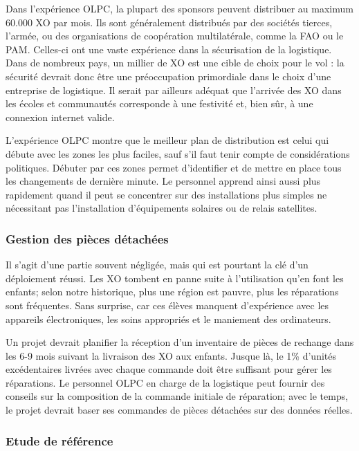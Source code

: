 \documentclass[12pt]{article}
\begin{document}

Dans l'expérience OLPC, la plupart des sponsors peuvent distribuer au
maximum 60.000 XO par mois. Ils sont généralement distribués par des
sociétés tierces, l'armée, ou des organisations de coopération
multilatérale, comme la FAO ou le PAM. Celles-ci ont une vaste expérience
dans la sécurisation de la logistique. Dans de nombreux pays, un millier de
XO est une cible de choix pour le vol : la sécurité devrait donc être une
préoccupation primordiale dans le choix d'une entreprise de logistique. Il
serait par ailleurs adéquat que l'arrivée des XO dans les écoles et
communautés corresponde à une festivité et, bien sûr, à une connexion
internet valide.

L'expérience OLPC montre que le meilleur plan de distribution est celui qui
débute avec les zones les plus faciles, sauf s'il faut tenir compte de
considérations politiques. Débuter par ces zones permet d’identifier et de
mettre en place tous les changements de dernière minute. Le personnel
apprend ainsi aussi plus rapidement quand il peut se concentrer sur des
installations plus simples ne nécessitant pas l'installation d'équipements
solaires ou de relais satellites.
\subsubsection{Gestion des pièces détachées}
\label{sec-9-1-3}



Il s'agit d'une partie souvent négligée, mais qui est pourtant la clé d'un
déploiement réussi. Les XO tombent en panne suite à l'utilisation qu'en
font les enfants; selon notre historique, plus une région est pauvre, plus
les réparations sont fréquentes. Sans surprise, car ces élèves manquent
d'expérience avec les appareils électroniques, les soins appropriés et le
maniement des ordinateurs.

Un projet devrait planifier la réception d'un inventaire de pièces de
rechange dans les 6-9 mois suivant la livraison des XO aux enfants. Jusque
là, le 1\% d'unités excédentaires livrées avec chaque commande doit être
suffisant pour gérer les réparations. Le personnel OLPC en charge de la
logistique peut fournir des conseils sur la composition de la commande
initiale de réparation; avec le temps, le projet devrait baser ses
commandes de pièces détachées sur des données réelles.
\subsubsection{Etude de référence}
\label{sec-9-1-4}
\end{document}
